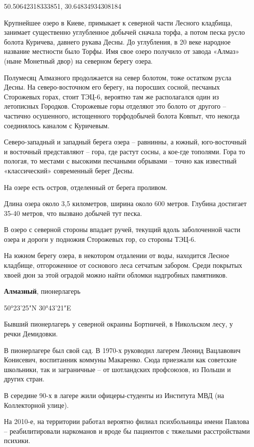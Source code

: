 50.50642318333851, 30.64834934308184

Крупнейшее озеро в Киеве, примыкает к северной части Лесного кладбища, занимает существенно углубленное добычей сначала торфа, а потом песка русло болота Куричева, давнего рукава Десны. До углубления, в 20 веке народное название местности было Торфы. Имя свое озеро получило от завода «Алмаз» (ныне Монетный двор) на северном берегу озера.

Полумесяц Алмазного продолжается на север болотом, тоже остатком русла Десны. На северо-восточном его берегу, на поросших сосной, песчаных Сторожевых горах, стоит ТЭЦ-6, вероятно там же располагался один из летописных Городков. Сторожевые горы отделяют это болото от другого – частично осушенного, истощенного торфодобычей болота Ковпыт, что некогда соединялось каналом с Куричевым.

Северо-западный и западный берега озера – равнинны, а южный, юго-восточный и восточный представляют – гора, где растут сосны, а кое-где тополями. Гора то пологая, то местами с высокими песчаными обрывами – точно как известный «классический» современный берег Десны. 

На озере есть остров, отделенный от берега проливом.

Длина озера около 3,5 километров, ширина около 600 метров. Глубина достигает 35-40 метров, что вызвано добычей тут песка.

В озеро с северной стороны впадает ручей, текущий вдоль заболоченной части озера и дороги у подножия Сторожевых гор, со стороны ТЭЦ-6.

На южном берегу озера, в некотором отдалении от воды, находится Лесное кладбище, отгороженное от соснового леса сетчатым забором. Среди покрытых хвоей дюн за этой оградой можно найти обломки надгробных памятников.\\

\medskip


\textbf{Алмазный}, пионерлагерь

50°23'25"N 30°43'21"E

Бывший пионерлагерь у северной окраины Бортничей, в Никольском лесу, у речки Демидовки.

В пионерлагере был свой сад. В 1970-х руководил лагерем Леонид Вацлавович Конисевич, воспитанник коммуны Макаренко. Сюда приезжали как советские школьники, так и заграничные – от шотландских профсоюзов, из Польши и других стран.

В середине 90-х в лагере жили офицеры-студенты из Института МВД (на Коллекторной улице).

На 2010-е, на территории работал вероятно филиал психбольницы имени Павлова – реабилитировали наркоманов и вроде бы пациентов с тяжелыми расстройствами психики.
